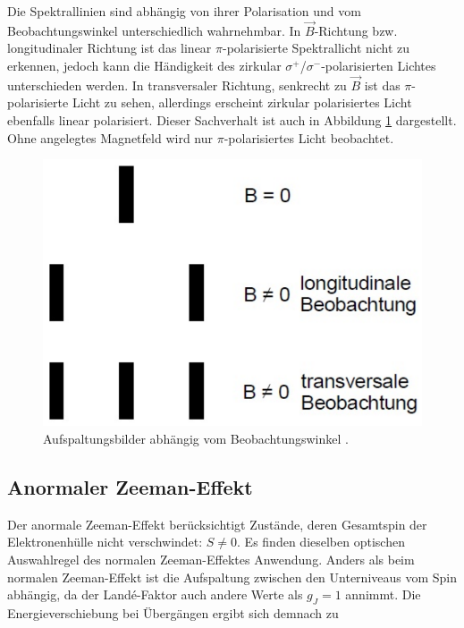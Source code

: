 Die Spektrallinien sind abhängig von ihrer Polarisation und vom Beobachtungswinkel unterschiedlich
wahrnehmbar. In $\vec{B}$-Richtung bzw. longitudinaler Richtung ist das linear $\pi$-polarisierte Spektrallicht
nicht zu erkennen, jedoch kann die Händigkeit des zirkular $\sigma^{+}$/$\sigma^{-}$-polarisierten Lichtes
unterschieden werden. In transversaler Richtung, senkrecht zu $\vec{B}$ ist das $\pi$-polarisierte Licht
zu sehen, allerdings erscheint zirkular polarisiertes Licht ebenfalls linear polarisiert.
Dieser Sachverhalt ist auch in Abbildung \ref{fig:pol} dargestellt. Ohne angelegtes Magnetfeld
wird nur $\pi$-polarisiertes Licht beobachtet.

\vspace{-5pt}
\begin{figure}[H]
    \centering
    \includegraphics[scale=0.2]{content/polarisation.png}
    \vspace{-10pt}
    \vspace{3pt}
    \caption{Aufspaltungsbilder abhängig vom Beobachtungswinkel \cite{alt}.}
    \label{fig:pol}
\end{figure}

\subsection{Anormaler Zeeman-Effekt}

Der anormale Zeeman-Effekt berücksichtigt Zustände, deren Gesamtspin der Elektronenhülle nicht verschwindet: $S \neq 0$.
Es finden dieselben optischen Auswahlregel des normalen Zeeman-Effektes Anwendung.
Anders als beim normalen Zeeman-Effekt ist die Aufspaltung zwischen den Unterniveaus vom Spin abhängig, da der 
Landé-Faktor auch andere Werte als $g_J = 1$ annimmt. Die Energieverschiebung bei Übergängen ergibt sich demnach zu

